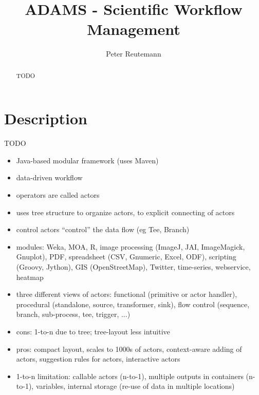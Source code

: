 \documentclass[a4paper,10pt]{article}
\title{ADAMS - Scientific Workflow Management}
\author{Peter Reutemann}
\begin{document}
\maketitle

\begin{abstract}
TODO
\end{abstract}

\section{Description}
TODO

\begin{itemize}
  \item Java-based modular framework (uses Maven)
  \item data-driven workflow
  \item operators are called actors
  \item uses tree structure to organize actors, to explicit connecting of actors
  \item control actors ``control'' the data flow (eg Tee, Branch)
  \item modules: Weka, MOA, R, image processing (ImageJ, JAI, ImageMagick, Gnuplot), PDF, spreadsheet (CSV, Gnumeric, Excel, ODF), scripting (Groovy, Jython), GIS (OpenStreetMap), Twitter, time-series, webservice, heatmap
  \item three different views of actors: functional (primitive or actor handler), procedural (standalone, source, transformer, sink), flow control (sequence, branch, sub-process, tee, trigger, ...)
  \item cons: 1-to-n due to tree; tree-layout less intuitive
  \item pros: compact layout, scales to 1000s of actors, context-aware adding of actors, suggestion rules for actors, interactive actors
  \item 1-to-n limitation: callable actors (n-to-1), multiple outputs in containers (n-to-1), variables, internal storage (re-use of data in multiple locations)
\end{itemize}
\end{document}
